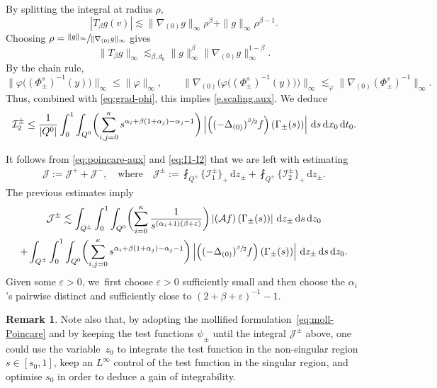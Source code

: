\documentclass[10pt]{amsart}
\let\epsilon\varepsilon
\theoremstyle{definition}
\newtheorem{remark}[theorem]{Remark}
\newcommand{\cA}{{\mathcal A}}
\newcommand{\cI}{{\mathcal I}}
\newcommand{\cJ}{{\mathcal J}}
\newcommand{\dd}{{\, \mathrm d}}
\let\var\varepsilon
\begin{document}
By splitting the integral at radius \(\rho\),
\[
|T_\beta g(v)|
\lesssim \|\nabla_{(0)}g\|_\infty\rho^\beta+\|g\|_\infty\rho^{\beta-1}.
\]
Choosing \(\rho=\sfrac{\|g\|_\infty}{\|\nabla_{(0)}g\|_\infty}\) gives
\[
\|T_\beta g\|_\infty
\lesssim_{\beta,d_0}
\|g\|_\infty^\beta
\|\nabla_{(0)}g\|_\infty^{1-\beta}.
\]
By the chain rule,
\[
\|\varphi\big((\Phi_\pm^s)^{-1}(y)\big)\|_\infty\leq \|\varphi\|_\infty,
\qquad
\|\nabla_{(0)}\Big(\varphi\big((\Phi_\pm^s)^{-1}(y)\big)\Big)\|_\infty
\lesssim_\varphi
\|\nabla_{(0)}(\Phi_\pm^s)^{-1}\|_\infty.
\]
Thus, combined with \eqref{eq:grad-phi}, this implies \eqref{e.scaling.aux}.
We deduce
\begin{equation*}
\cI_2^\pm
\le \frac{1}{\vert Q^0\vert }\int_0^1 \int_{Q^0} \biggl(\sum_{i,j=0} ^\kappa s^{ \alpha_i +\beta(1+\alpha_j) - \alpha_j - 1} \biggr) \left|
\left((-\Delta_{(0)})^{\sfrac{\beta}{2}} f\right)\left(
\Gamma_\pm(s) \right) \right| \dd s \dd x_0 \dd t_0.
\end{equation*}

It follows from \eqref{eq:poincare-aux} and \eqref{eq:I1-I2} that
we are left with estimating
{
\begin{align*}
\cJ := \cJ^+ + \cJ^-, \quad \text{where} \quad
\cJ^{\pm} := \fint_{Q^\pm} \big\{\cI^\pm_1\big\}_+ \dd
z_\pm + \fint_{Q^\pm} \big\{\cI^\pm_2\big\}_+ \dd
z_\pm.
\end{align*}
}
The previous estimates imply
\begin{multline}
\label{eq:J-gen}
{\cJ^{\pm}}\lesssim \int_{Q^\pm} \int_0^1 \int_{Q^0}
\biggl(\sum_{i = 0}^\kappa \frac{1}{ s^{(\alpha_i+1)(\beta+\epsilon)}}
\biggr) \left| \left(\cA f \right) (\Gamma_\pm(s))\right|
\dd z_\pm \dd s
\dd z_0 \\
+ \int_{Q^\pm} \int_0^1\int_{Q^0} \biggl(\sum_{i,j =
0}^\kappa s^{\alpha_i +\beta(1+\alpha_j) - \alpha_j -1} \biggr) \left| \left(
(-\Delta_{(0)})^{\sfrac{\beta}{2}}f\right)\left(
\Gamma_\pm(s) \right) \right| \dd z_\pm \dd s \dd z_0.
\end{multline}
Given some $\var>0$, we~first choose $\epsilon>0$ sufficiently small
and then choose the $\alpha_i$'s pairwise distinct and sufficiently
close to $(2+\beta+\epsilon)^{-1}-1$.

\begin{remark}
\label{rmk_gain_int}
Note also that, by adopting the mollified
formulation~\eqref{eq:moll-Poincare} and by keeping the test
functions $\psi_\pm$ until the integral {$\cJ^{\pm}$} above, one could
use the variable~$z_0$ to integrate the test function in the
non-singular region $s \in [s_0,1]$, keep an $L ^\infty$ control
of the test function in the singular region, and optimise
$s_0$ in order to deduce a gain of integrability.
\end{remark}
\end{document}
